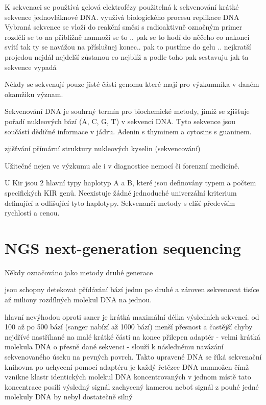 \documentclass[czech,DP]{thesiskiv}
\begin{document}
 K sekvenaci se použtívá gelová elektrofézy
 použitelná k sekvenování krátké sekvence jednovláknové DNA. 
 využívá biologického procesu replikace DNA
 Vybraná sekvence se vloží do reakční směsi s radioaktivně označným primer
 rozdělí se to na přibližně 
 namnoží se to .. 
 pak se to hodí do něčeho co nakonci svítí tak ty se navážou na příslušnej konec.. 
 pak to pustíme do gelu .. 
 nejkratší projedou nejdál
 nejdelší zůstanou co nejblíž a podle toho pak sestavuju jak ta sekvence vypadá




Někdy se sekvenují pouze jisté části genomu které mají pro výzkumníka v daném okamžiku význam.

Sekvenování DNA je souhrný termín pro biochemické metody, jímiž se zjišťuje pořadí nukleových bází (A, C, G, T) v sekvencí DNA. Tyto sekvence jsou součástí dědičné informace v jádru.
Adenin s thyminem a cytosins s guaninem.

zjišťvání přímární struktury nukleových kyselin (sekvencování)

Užitečné nejen ve výzkumu ale i v diagnostice nemocí či forenzní medicíně. 


U Kir jsou 2 hlavní typy haplotyp A a B, které jsou definovány typem a počtem specifických KIR genů. Neexistuje žádné jednoduché univerzální kriterium definující a odlišující tyto haplotypy. 
Sekvenančí metody s elíší především rychlostí a cenou.

 
 
\section{NGS next-generation sequencing}
Někdy označováno jako metody druhé generace
 
jsou schopny detekovat přídávání bází jednu po druhé a zároven sekvenovat tisíce až miliony rozdílných molekul DNA na jednou. 

hlavní nevýhodou oproti saner je krátká maximální délka výsledních sekvencí. od 100 až po 500 bází (sanger nabízí až 1000 bází)
menší přesnost a častější chyby
nejdřívé nastříhané na malé krátké části na konec přilepen adaptér - velmi krátká molekula DNA o přesně dané sekvenci
- slouží k následnému navázání sekvenovaného úseku na pevných povrch. Takto upravené DNA se říká sekvenační knihovna
po uchycení pomocí adaptéru je každý řetězec DNA namnožen čímž vznikne klastr identických molekul DNA koncentrovaných v jednom místě
tato koncentrace posílí výsledný signál zachycený kamerou neboť signál z pouhé jedné molekuly DNA by nebyl dostatečně silný
 
\end{document}

